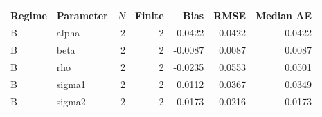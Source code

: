 \begin{tabular}{llrrrrr}
\toprule
Regime & Parameter & $N$ & Finite & Bias & RMSE & Median AE \\
\midrule
B & alpha & 2 & 2 & 0.0422 & 0.0422 & 0.0422 \\
B & beta & 2 & 2 & -0.0087 & 0.0087 & 0.0087 \\
B & rho & 2 & 2 & -0.0235 & 0.0553 & 0.0501 \\
B & sigma1 & 2 & 2 & 0.0112 & 0.0367 & 0.0349 \\
B & sigma2 & 2 & 2 & -0.0173 & 0.0216 & 0.0173 \\
\bottomrule
\end{tabular}
